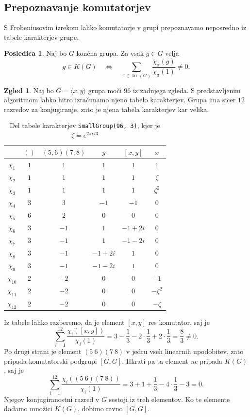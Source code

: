 \documentclass[11pt]{book}
\DeclareMathOperator\Irr{Irr}
\theoremstyle{definition}
\theoremstyle{zgled}
\newtheorem{zgled}[theorem]{Zgled}
\theoremstyle{zgledbrezstevilke}
\theoremstyle{odprtproblem}
\theoremstyle{domacanaloga}
\theoremstyle{izrek}
\newtheorem{posledica}[theorem]{Posledica}
\begin{document}
\subsection{Prepoznavanje komutatorjev}

S Frobeniusovim izrekom lahko komutatorje v grupi prepoznavamo neposredno iz tabele karakterjev grupe.

\begin{posledica}
Naj bo $G$ končna grupa. Za vsak $g \in G$ velja
\[
    g \in K(G) \quad \Longleftrightarrow \quad \sum_{\pi \in \Irr(G)} \frac{\chi_{\pi}(g)}{\chi_{\pi}(1)} \neq 0.
\]
\end{posledica}

\begin{zgled}
Naj bo $G = \langle x, y \rangle$ grupa moči $96$ iz zadnjega zgleda. S predstavljenim algoritmom lahko hitro izračunamo njeno tabelo karakterjev. Grupa ima sicer $12$ razredov za konjugiranje, zato je njena tabela karakterjev kar velika. 

\begin{table}[t]
    \centering
\begin{tabular}{c|*{5}{c}}
    & $()$ & $(5,6)(7,8)$ & $y$ & $[x,y]$ & $x$\\ \hline 
    $\chi_{1}$ & $1$ & $1$ & $1$ & $1$ & $1$\\ 
    $\chi_{2}$ & $1$ & $1$ & $1$ & $1$ & $\zeta$\\ 
    $\chi_{3}$ & $1$ & $1$ & $1$ & $1$ & $\zeta^2$\\ 
    $\chi_{4}$ & $3$ & $3$ & $-1$ & $-1$ & $0$\\ 
    $\chi_{5}$ & $6$ & $2$ & $0$ & $0$ & $0$\\ 
    $\chi_{6}$ & $3$ & $-1$ & $1$ & $-1+2i$ & $0$\\ 
    $\chi_{7}$ & $3$ & $-1$ & $1$ & $-1-2i$ & $0$\\ 
    $\chi_{8}$ & $3$ & $-1$ & $-1+2i$ & $1$ & $0$\\ 
    $\chi_{9}$ & $3$ & $-1$ & $-1-2i$ & $1$ & $0$\\ 
    $\chi_{10}$ & $2$ & $-2$ & $0$ & $0$ & $-1$\\ 
    $\chi_{11}$ & $2$ & $-2$ & $0$ & $0$ & $-\zeta^2$\\ 
    $\chi_{12}$ & $2$ & $-2$ & $0$ & $0$ & $-\zeta$\\
\end{tabular}
\caption{Del tabele karakterjev \texttt{SmallGroup(96, 3)}, kjer je $\zeta = e^{2 \pi i / 3}$}
\end{table}

Iz tabele lahko razberemo, da je element $[x,y]$ res komutator, saj je 
\[
    \sum_{i = 1}^{12} \frac{\chi_i([x,y])}{\chi_i(1)} = 
    3 - \frac13 - 2 \cdot \frac13 + 2 \cdot \frac13 = 
    \frac83 \neq 0.
\]
Po drugi strani je element $(5 \ 6)(7 \ 8)$ v jedru vseh linearnih upodobitev, zato pripada komutatorski podgrupi $[G,G]$. Hkrati pa ta element \emph{ne} pripada $K(G)$, saj je 
\[
    \sum_{i = 1}^{12} \frac{\chi_i((5 \ 6)(7 \ 8))}{\chi_i(1)} =
    3 + 1 + \frac13 - 4 \cdot \frac13 - 3 = 0.
\]
Njegov konjugiranostni razred v $G$ sestoji iz treh elementov. Ko te elemente dodamo množici $K(G)$, dobimo ravno $[G,G]$.
\end{zgled}
\end{document}
